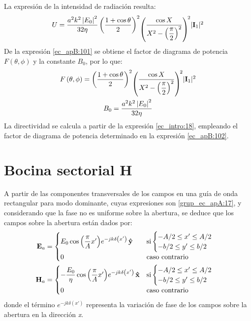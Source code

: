 La expresión de la intensidad de radiación resulta:
\begin{align}
\raisebox{2.31mm}{$U = \dfrac{a^2k^2\left|E_0\right|^2}{32\eta}\left(\dfrac{1 + \cos\theta}{2}\right)^2$}\!\left(\raisebox{2.31mm}{$\dfrac{\cos X}{X^2 - \left(\dfrac{\pi}{2}\right)^2}$}\right)^{\!2}\!\raisebox{2.31mm}{$\lvert{\mathbf{I}_1}\rvert^2$}
\label{ec_apB:101}
\end{align}
De la expresión \eqref{ec_apB:101} se obtiene el factor de diagrama de potencia $F\left(\theta,\phi\right)$ y la constante $B_0$, por lo que:
\begin{gather}
\raisebox{2.31mm}{$F\left(\theta,\phi\right) = \left(\dfrac{1 + \cos\theta}{2}\right)^2$}\!\left(\raisebox{2.31mm}{$\dfrac{\cos X}{X^2 - \left(\dfrac{\pi}{2}\right)^2}$}\right)^{\!2}\!\raisebox{2.31mm}{$\lvert{\mathbf{I}_1}\rvert^2$}
\label{ec_apB:102}\\
B_0 = \frac{a^2k^2\left|E_0\right|^2}{32\eta}
\label{ec_apB:103}
\end{gather}
La directividad se calcula a partir de la expresión \eqref{ec_intro:18}, empleando el factor de diagrama de potencia determinado en la expresión \eqref{ec_apB:102}.

\section{Bocina sectorial H}
\label{sec_apendice_b_boci_sech}

A partir de las componentes transversales de los campos en una guía de onda rectangular para modo dominante, cuyas expresiones son \eqref{grup_ec_apA:17}, y considerando que la fase no es uniforme sobre la abertura, se deduce que los campos sobre la abertura están dados por:
\begin{align}
\mathbf{E}_a &= 
\begin{cases}
\makebox[0pt][l]{$E_0\cos\left(\dfrac{\pi}{A}x'\right)\!e^{-jk\delta\left(x'\right)}\,\versor{y}$}\hphantom{-\dfrac{E_0}{\eta}\cos\left(\dfrac{\pi}{A}x'\right)\!e^{-jk\delta\left(x'\right)}\,\versor{x}} &\text{si}
\begin{cases} 
-A/2 \leq x' \leq A/2\\
-b/2 \leq y' \leq b/2
\end{cases}\\
0  &\text{caso contrario}
\end{cases}
\label{ec_apB:104}\\
\mathbf{H}_a &= 
\begin{cases} 
-\dfrac{E_0}{\eta}\cos\left(\dfrac{\pi}{A}x'\right)\!e^{-jk\delta\left(x'\right)}\,\versor{x} &\text{si}
\begin{cases} 
-A/2 \leq x' \leq A/2\\
-b/2 \leq y' \leq b/2
\end{cases}\\
0  & \text{caso contrario}
\end{cases}
\label{ec_apB:105}
\end{align}
donde el término $e^{-jk\delta\left(x'\right)}$ representa la variación de fase de los campos sobre la abertura en la dirección \emph{x}.

